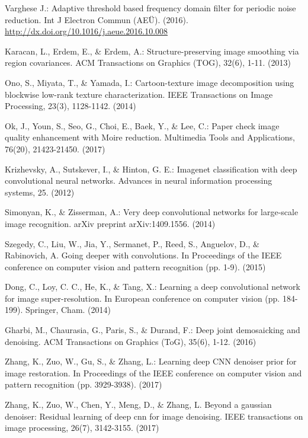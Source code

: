 \documentclass[10pt,letterpaper]{article}
\begin{document}
\begin{thebibliography}{0}
Varghese J.: Adaptive threshold based frequency domain filter for periodic noise reduction. Int J Electron Commun (AEÜ). (2016). \url{http://dx.doi.org/10.1016/j.aeue.2016.10.008}

Karacan, L., Erdem, E., \& Erdem, A.: Structure-preserving image smoothing via region covariances. ACM Transactions on Graphics (TOG), 32(6), 1-11. (2013)

Ono, S., Miyata, T., \& Yamada, I.: Cartoon-texture image decomposition using blockwise low-rank texture characterization. IEEE Transactions on Image Processing, 23(3), 1128-1142. (2014)

Ok, J., Youn, S., Seo, G., Choi, E., Baek, Y., \& Lee, C.: Paper check image quality enhancement with Moire reduction. Multimedia Tools and Applications, 76(20), 21423-21450. (2017)

Krizhevsky, A., Sutskever, I., \& Hinton, G. E.: Imagenet classification with deep convolutional neural networks. Advances in neural information processing systems, 25. (2012)

Simonyan, K., \& Zisserman, A.: Very deep convolutional networks for large-scale image recognition. arXiv preprint arXiv:1409.1556. (2014)

Szegedy, C., Liu, W., Jia, Y., Sermanet, P., Reed, S., Anguelov, D., \& Rabinovich, A. Going deeper with convolutions. In Proceedings of the IEEE conference on computer vision and pattern recognition (pp. 1-9). (2015)

Dong, C., Loy, C. C., He, K., \& Tang, X.: Learning a deep convolutional network for image super-resolution. In European conference on computer vision (pp. 184-199). Springer, Cham. (2014)

Gharbi, M., Chaurasia, G., Paris, S., \& Durand, F.: Deep joint demosaicking and denoising. ACM Transactions on Graphics (ToG), 35(6), 1-12. (2016)

Zhang, K., Zuo, W., Gu, S., \& Zhang, L.: Learning deep CNN denoiser prior for image restoration. In Proceedings of the IEEE conference on computer vision and pattern recognition (pp. 3929-3938). (2017)

Zhang, K., Zuo, W., Chen, Y., Meng, D., \& Zhang, L. Beyond a gaussian denoiser: Residual learning of deep cnn for image denoising. IEEE transactions on image processing, 26(7), 3142-3155. (2017)


\end{thebibliography}
\end{document}
